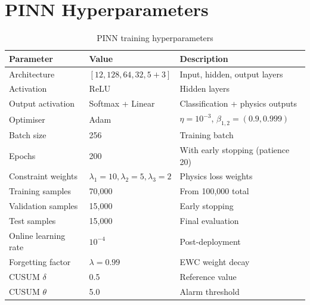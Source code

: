 \section{PINN Hyperparameters}
\label{app:pinn}

\begin{table}[htbp]
\caption{PINN training hyperparameters}
\label{tab:app_pinn}
\begin{tabularx}{\textwidth}{@{}lXl@{}}
\toprule
Parameter & Value & Description \\
\midrule
Architecture & $[12, 128, 64, 32, 5+3]$ & Input, hidden, output layers \\
Activation & ReLU & Hidden layers \\
Output activation & Softmax + Linear & Classification + physics outputs \\
Optimiser & Adam & $\eta = 10^{-3}$, $\beta_{1,2} = (0.9, 0.999)$ \\
Batch size & 256 & Training batch \\
Epochs & 200 & With early stopping (patience 20) \\
Constraint weights & $\lambda_1=10, \lambda_2=5, \lambda_3=2$ & Physics loss weights \\
Training samples & 70{,}000 & From 100{,}000 total \\
Validation samples & 15{,}000 & Early stopping \\
Test samples & 15{,}000 & Final evaluation \\
Online learning rate & $10^{-4}$ & Post-deployment \\
Forgetting factor & $\lambda = 0.99$ & EWC weight decay \\
CUSUM $\delta$ & 0.5 & Reference value \\
CUSUM $\theta$ & 5.0 & Alarm threshold \\
\bottomrule
\end{tabularx}
\end{table}

